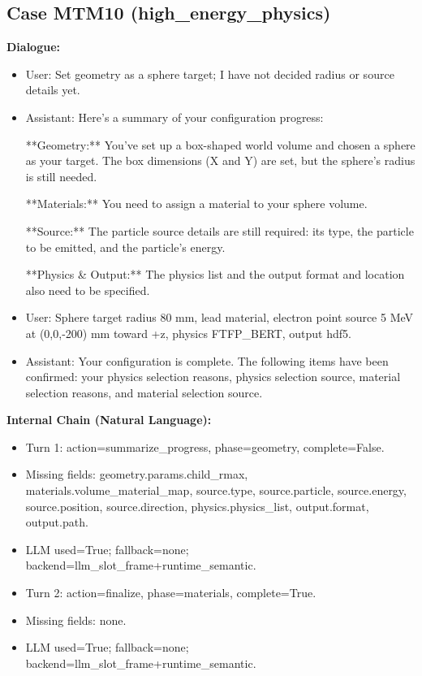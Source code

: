 \documentclass[11pt]{ctexart}
\begin{document}
\subsection{Case MTM10 (high\_energy\_physics)}
\textbf{Dialogue:}
\begin{itemize}
\item User: Set geometry as a sphere target; I have not decided radius or source details yet.
\item Assistant: Here's a summary of your configuration progress:

**Geometry:** You've set up a box-shaped world volume and chosen a sphere as your target. The box dimensions (X and Y) are set, but the sphere's radius is still needed.

**Materials:** You need to assign a material to your sphere volume.

**Source:** The particle source details are still required: its type, the particle to be emitted, and the particle's energy.

**Physics \& Output:** The physics list and the output format and location also need to be specified.
\item User: Sphere target radius 80 mm, lead material, electron point source 5 MeV at (0,0,-200) mm toward +z, physics FTFP\_BERT, output hdf5.
\item Assistant: Your configuration is complete. The following items have been confirmed: your physics selection reasons, physics selection source, material selection reasons, and material selection source.
\end{itemize}
\textbf{Internal Chain (Natural Language):}
\begin{itemize}
\item Turn 1: action=summarize\_progress, phase=geometry, complete=False.
\item Missing fields: geometry.params.child\_rmax, materials.volume\_material\_map, source.type, source.particle, source.energy, source.position, source.direction, physics.physics\_list, output.format, output.path.
\item LLM used=True; fallback=none; backend=llm\_slot\_frame+runtime\_semantic.
\item Turn 2: action=finalize, phase=materials, complete=True.
\item Missing fields: none.
\item LLM used=True; fallback=none; backend=llm\_slot\_frame+runtime\_semantic.
\end{itemize}
\end{document}
